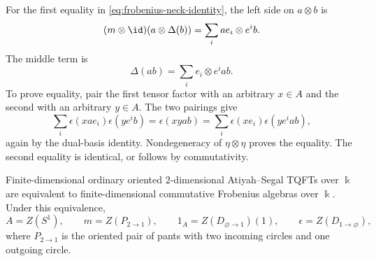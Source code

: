 For the first equality in \eqref{eq:frobenius-neck-identity}, the left side on
\(a\otimes b\) is
\[
  (m\otimes\id)(a\otimes\Delta(b))
  =
  \sum_i ae_i\otimes e^i b .
\]
The middle term is
\[
  \Delta(ab)=\sum_i e_i\otimes e^i ab .
\]
To prove equality, pair the first tensor factor with an arbitrary \(x\in A\)
and the second with an arbitrary \(y\in A\).  The two pairings give
\[
  \sum_i \epsilon(xae_i)\epsilon(ye^i b)
  =
  \epsilon(xyab)
  =
  \sum_i \epsilon(xe_i)\epsilon(ye^i ab),
\]
again by the dual-basis identity.  Nondegeneracy of
\(\eta\otimes\eta\) proves the equality.  The second equality is identical,
or follows by commutativity.

\begin{theorem}
\label{thm:2d-oriented-tqft-frobenius}
Finite-dimensional ordinary oriented \(2\)-dimensional Atiyah--Segal TQFTs
over \(\Bbbk\) are equivalent to finite-dimensional commutative Frobenius
algebras over \(\Bbbk\).  Under this equivalence,
\[
  A=Z(S^1),
  \qquad
  m=Z(P_{2\to1}),
  \qquad
  1_A=Z(D_{\varnothing\to1})(1),
  \qquad
  \epsilon=Z(D_{1\to\varnothing}),
\]
where \(P_{2\to1}\) is the oriented pair of pants with two incoming circles
and one outgoing circle.
\end{theorem}

